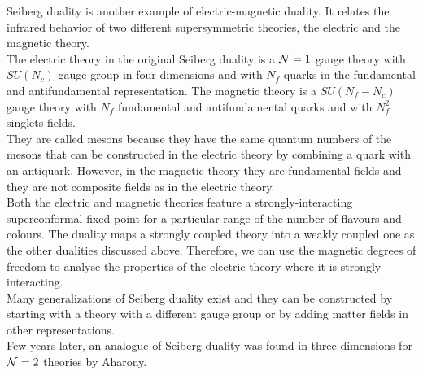  Seiberg duality is another example of electric-magnetic duality.
It relates the infrared behavior of two different supersymmetric theories, the electric and the magnetic theory.\\
The electric theory in the original Seiberg duality is a $\mathcal{N}=1$ gauge theory with $SU(N_c)$ gauge group in four dimensions and with $N_f$ quarks in the fundamental and antifundamental representation.
The magnetic theory is a $SU(N_f-N_c)$ gauge theory with $N_f$ fundamental and antifundamental quarks and with $N_f^2$ singlets fields. \\
They are called mesons because they have the same quantum numbers of the mesons that can be constructed in the electric theory by combining a quark with an antiquark. 
However, in the magnetic theory they are fundamental fields and they are not composite fields as in the electric theory.\\
Both the electric and magnetic theories feature a strongly-interacting superconformal fixed point for a particular range of the number of flavours and colours. 
The duality maps a strongly coupled theory into a weakly coupled one as the other dualities discussed above. 
Therefore, we can use the magnetic degrees of freedom to analyse the properties of the electric theory where it is strongly interacting.\\
Many generalizations of Seiberg duality exist and they can be constructed by starting with a theory with a different gauge group or by adding matter fields in other representations.\\
Few years later, an analogue of Seiberg duality was found in three dimensions for $\mathcal{N}=2$ theories by Aharony.\\

